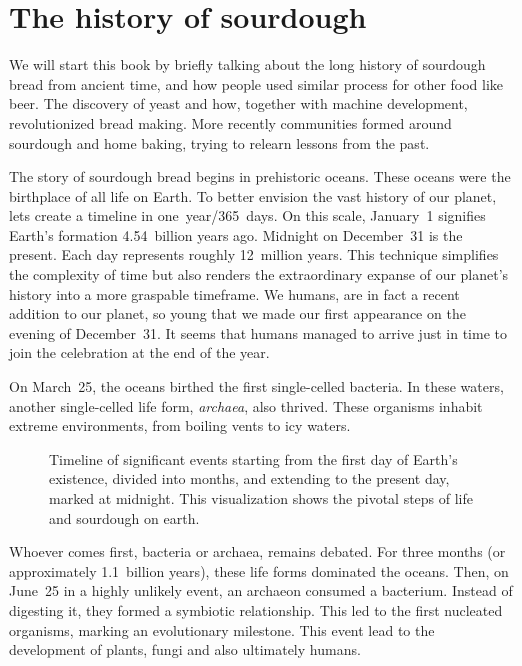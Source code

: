 \chapter{The history of sourdough}%
\label{ch:history}
\begin{quoting}
    We will start this book by briefly talking about the long history of
    sourdough bread from ancient time, and how people used similar process for
    other food like beer. The discovery of yeast and how, together with
    machine development, revolutionized bread making.  More recently
    communities formed around sourdough and home baking, trying to relearn
    lessons from the past.
\end{quoting}

The story of sourdough bread begins in prehistoric oceans. These oceans were the
birthplace of all life on Earth. To better envision the vast history of
our planet, lets create a timeline in one~year/365~days. On this scale,
January~1 signifies Earth's
formation 4.54~billion years ago. Midnight on December~31 is the present.
Each day represents roughly 12~million years. This technique simplifies the
complexity of time but also renders the extraordinary expanse of our planet's
history into a more graspable timeframe. We humans, are in fact a recent
addition to our planet, so young that we made our first appearance on
the evening of December~31.  It seems that humans managed to arrive just
in time to join the celebration at the end of the year.

On March~25, the oceans birthed the first single-celled bacteria. In these
waters, another single-celled life form, \emph{archaea}, also thrived. These
organisms inhabit extreme environments, from boiling vents to icy waters.

\begin{figure}[!htb]
  \centering
  
  \caption[Sourdough microbiology timeline]{Timeline of significant events
    starting from the first day of Earth's existence,
    divided into months, and extending to the present day,
    marked at midnight. This visualization shows the pivotal steps
    of life and sourdough on earth.}%
  \label{fig:planet-timeline}
\end{figure}

Whoever comes first, bacteria or archaea, remains debated. For three
months (or approximately 1.1~billion years), these life forms dominated
the oceans. Then, on June~25 in a highly unlikely event, an archaeon consumed a bacterium.
Instead of digesting it, they formed a symbiotic relationship. This led to the
first nucleated organisms, marking an evolutionary milestone. This event lead
to the development of plants, fungi and also ultimately humans.

